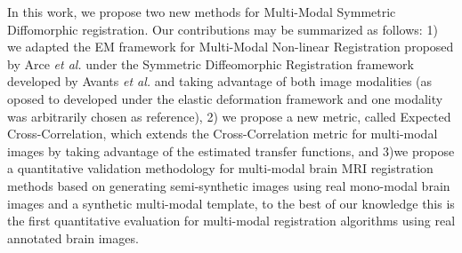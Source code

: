 In this work, we propose two new methods for Multi-Modal Symmetric Diffomorphic registration. Our contributions may be summarized as follows: 1) we adapted the EM framework for
Multi-Modal Non-linear Registration proposed by Arce {\it et al.}\cite{Arce-santana2014} under the Symmetric
Diffeomorphic Registration framework developed by Avants {\it et al.}\cite{Avants2008} \cite{Avants2011} and taking advantage of both image modalities (as oposed to \cite{Arce-santana2014} developed under the elastic deformation framework and one modality was arbitrarily chosen as reference),
2) we propose a new metric, called Expected Cross-Correlation, which extends the Cross-Correlation metric for multi-modal images by taking
advantage of the estimated transfer functions, and 3)we propose a quantitative validation methodology for multi-modal brain MRI registration methods
based on generating semi-synthetic images using real mono-modal brain images and a synthetic multi-modal template, to the best of our knowledge this is the first
quantitative evaluation for multi-modal registration algorithms using real annotated brain images.\\
